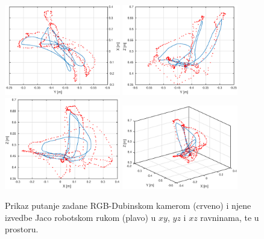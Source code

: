 \documentclass[times, utf8, diplomski, numeric]{fer}
\begin{document}
\begin{figure}[H]
\centering
\includegraphics[width=0.45\textwidth]{jaco_kinect_xy}
\includegraphics[width=0.45\textwidth]{jaco_kinect_yz}
\includegraphics[width=0.45\textwidth]{jaco_kinect_xz}
\includegraphics[width=0.45\textwidth]{jaco_kinect_xyz}
\caption{Prikaz putanje zadane RGB-Dubinskom kamerom (crveno) i njene izvedbe Jaco robotskom rukom (plavo) u $xy$, $yz$ i $xz$ ravninama, te u prostoru.}
\label{fig:jacok1}
\end{figure}
\end{document}
